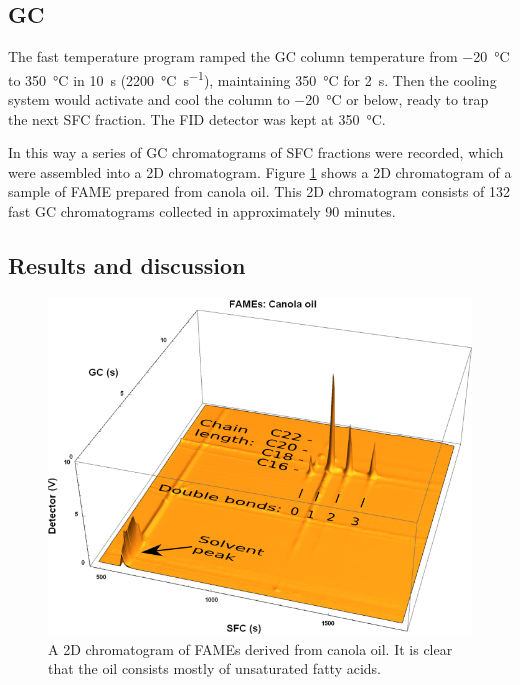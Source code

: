 \subsection{GC}

The fast temperature program ramped the GC column temperature from
\SI{-20}{\celsius} to \SI{350}{\celsius} in \SI{10}{s}
(\SI{2200}{\celsius\per\second}), maintaining \SI{350}{\celsius} for
\SI{2}{\second}. Then the cooling system would activate and cool the column to
\SI{-20}{\celsius} or below, ready to trap the next SFC fraction. The FID
detector was kept at \SI{350}{\celsius}.

In this way a series of GC chromatograms of SFC fractions were recorded, which
were assembled into a 2D chromatogram. Figure \ref{fig:2DCanola} shows
a 2D chromatogram of a sample of FAME prepared from canola oil. This 2D
chromatogram consists of 132 fast GC chromatograms collected in approximately 90
minutes.

\subsection{Results and discussion}

\begin{figure}
\centering
\includegraphics[width=\textwidth]{Figures/Interpretation.png}
\decoRule

\caption[SFC×GC of canola oil]{A 2D chromatogram of FAMEs derived from
canola oil. It is clear that the oil consists mostly of unsaturated fatty
acids.}

\label{fig:2DCanola}
\end{figure}

